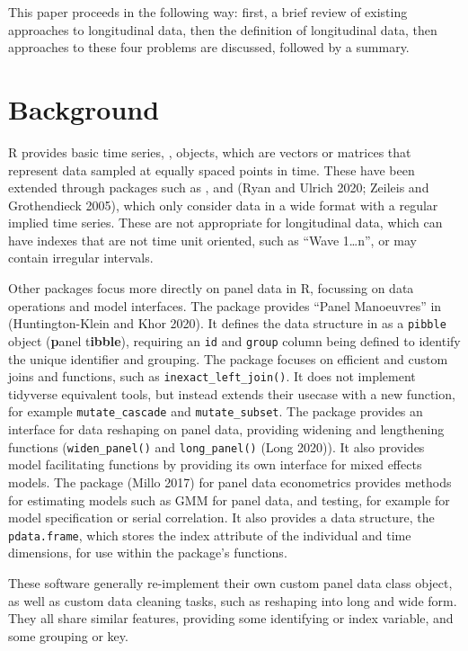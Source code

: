 This paper proceeds in the following way: first, a brief review of existing approaches to longitudinal data, then the definition of longitudinal data, then approaches to these four problems are discussed, followed by a summary.

\hypertarget{background}{%
\section{Background}\label{background}}

R provides basic time series, , objects, which are vectors or matrices that represent data sampled at equally spaced points in time. These have been extended through packages such as , and  (Ryan and Ulrich 2020; Zeileis and Grothendieck 2005), which only consider data in a wide format with a regular implied time series. These are not appropriate for longitudinal data, which can have indexes that are not time unit oriented, such as ``Wave 1\ldots n'', or may contain irregular intervals.

Other packages focus more directly on panel data in R, focussing on data operations and model interfaces. The  package provides ``Panel Manoeuvres'' in (Huntington-Klein and Khor 2020). It defines the data structure in as a \texttt{pibble} object (\textbf{p}anel t\textbf{ibble}), requiring an \texttt{id} and \texttt{group} column being defined to identify the unique identifier and grouping. The  package focuses on efficient and custom joins and functions, such as \texttt{inexact\_left\_join()}. It does not implement tidyverse equivalent tools, but instead extends their usecase with a new function, for example \texttt{mutate\_cascade} and \texttt{mutate\_subset}. The  package provides an interface for data reshaping on panel data, providing widening and lengthening functions (\texttt{widen\_panel()} and \texttt{long\_panel()} (Long 2020)). It also provides model facilitating functions by providing its own interface for mixed effects models. The  package (Millo 2017) for panel data econometrics provides methods for estimating models such as GMM for panel data, and testing, for example for model specification or serial correlation. It also provides a data structure, the \texttt{pdata.frame}, which stores the index attribute of the individual and time dimensions, for use within the package's functions.

These software generally re-implement their own custom panel data class object, as well as custom data cleaning tasks, such as reshaping into long and wide form. They all share similar features, providing some identifying or index variable, and some grouping or key.

